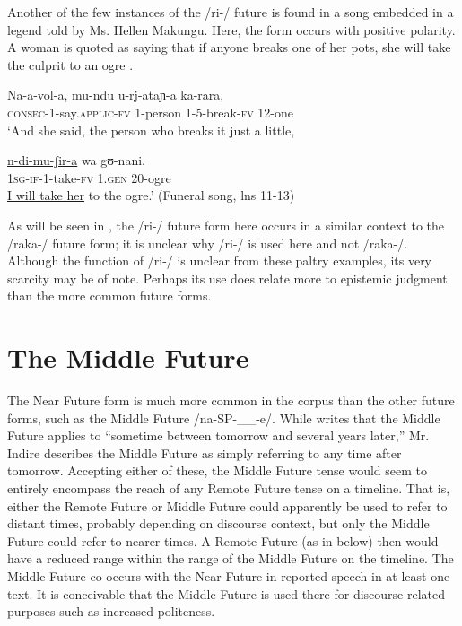 \documentclass[output=paper]{langsci/langscibook}
\begin{document}
Another of the few instances of the /ri-/ future is found in a song embedded in a legend told by Ms. Hellen Makungu. Here, the form occurs with positive polarity. A woman is quoted as saying that if anyone breaks one of her pots, she will take the culprit to an ogre .

\ea\label{ex:sarvasy:11}
\gll Na-a-vol-a,      mu-ndu  u-rj-ataɲ-a  ka-rara, \\
\textsc{consec-1}{}-say.\textsc{applic-fv}  1-person  1-5-break-\textsc{fv}  12-one \\
\glt ‘And she said, the person who breaks it just a little,

\gll \underline{n-di-mu-ʃir-a}     wa   gʊ-nani. \\
\textsc{1sg-if-}1-take-\textsc{fv}  \textsc{1.gen}  20-ogre \\
\glt \underline{I will take her} to the ogre.’ (Funeral song, lns 11-13)
\z

As will be seen in , the /ri-/ future form here occurs in a similar context to the /raka-/ future form; it is unclear why /ri-/ is used here and not /raka-/. Although the function of /ri-/ is unclear from these paltry examples, its very scarcity may be of note. Perhaps its use does relate more to epistemic judgment than the more common future forms.

\section{The Middle Future}

The Near Future form is much more common in the corpus than the other future forms, such as the Middle Future /na-SP-\_\_-e/. While \citet[285]{Leung1991} writes that the Middle Future applies to “sometime between tomorrow and several years later,” Mr. Indire describes the Middle Future as simply referring to any time after tomorrow. Accepting either of these, the Middle Future tense would seem to entirely encompass the reach of any Remote Future tense on a timeline. That is, either the Remote Future or Middle Future could apparently be used to refer to distant times, probably depending on discourse context, but only the Middle Future could refer to nearer times. A Remote Future (as in  below) then would have a reduced range within the range of the Middle Future on the timeline. %
%
The Middle Future co-occurs with the Near Future in reported speech in at least one text. It is conceivable that the Middle Future is used there for discourse-related purposes such as increased politeness. 
\end{document}

